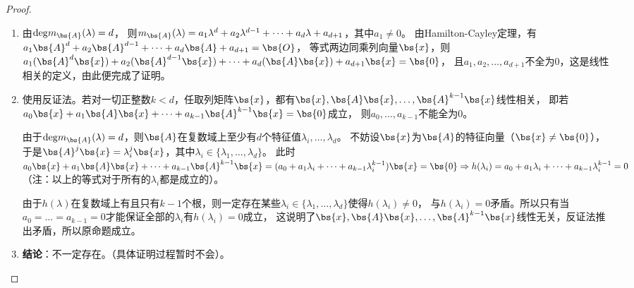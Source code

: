 \documentclass[12pt, a4paper, oneside, UTF8]{ctexbook}
\begin{document}
\begin{proof}
    \begin{enumerate}[label=(\arabic*)]
        \item 由$\mathrm{deg}m_{\bs{A}}(\lambda)=d$，
        则$m_{\bs{A}}(\lambda)=a_1\lambda^d+a_2\lambda^{d-1}+\cdots+a_d\lambda+a_{d+1}$，其中$a_1 \neq 0$。
        由Hamilton-Cayley定理，有$a_1\bs{A}^d+a_2\bs{A}^{d-1}+\cdots+a_d\bs{A}+a_{d+1}=\bs{O}$，
        等式两边同乘列向量$\bs{x}$，则$a_1(\bs{A}^d\bs{x})+a_2(\bs{A}^{d-1}\bs{x})+\cdots+a_d(\bs{A}\bs{x})+a_{d+1}\bs{x}=\bs{0}$，
        且$a_1,a_2,\ldots,a_{d+1}$不全为$0$，这是线性相关的定义，由此便完成了证明。
        \item 使用反证法。若对一切正整数$k<d$，任取列矩阵$\bs{x}$，都有$\bs{x},\bs{A}\bs{x},\ldots,\bs{A}^{k-1}\bs{x}$线性相关，
        即若$a_0\bs{x}+a_1\bs{A}\bs{x}+\cdots+a_{k-1}\bs{A}^{k-1}\bs{x}=\bs{0}$成立，
        则$a_0,\ldots,a_{k-1}$不能全为$0$。

        由于$\mathrm{deg}m_{\bs{A}}(\lambda)=d$，则$\bs{A}$在复数域上至少有$d$个特征值$\lambda_i,\ldots,\lambda_d$。
        不妨设$\bs{x}$为$\bs{A}$的特征向量（$\bs{x}\neq \bs{0}$），
        于是$\bs{A}^j\bs{x}=\lambda^j_i \bs{x}$，其中$\lambda_i \in \{\lambda_1,\ldots,\lambda_d\}$。
        此时$a_0\bs{x}+a_1\bs{A}\bs{x}+\cdots+a_{k-1}\bs{A}^{k-1}\bs{x}=
        (a_0+a_1\lambda_i+\cdots+a_{k-1}\lambda_i^{k-1})\bs{x}=\bs{0} \Rightarrow h(\lambda_i)=a_0+a_1\lambda_i+\cdots+a_{k-1}\lambda_i^{k-1}= 0$
        （注：以上的等式对于所有的$\lambda_i$都是成立的）。

        由于$h(\lambda)$在复数域上有且只有$k-1$个根，则一定存在某些$\lambda_i \in \{\lambda_1,\ldots,\lambda_d\}$使得$h(\lambda_i)\neq 0$，
        与$h(\lambda_i)=0$矛盾。所以只有当$a_0=\ldots=a_{k-1}=0$才能保证全部的$\lambda_i$有$h(\lambda_i)=0$成立，
        这说明了$\bs{x},\bs{A}\bs{x},\ldots,\bs{A}^{k-1}\bs{x}$线性无关，反证法推出矛盾，所以原命题成立。 \label{第二问解答}
        \item \textbf{结论}：不一定存在。（具体证明过程暂时不会）。
    \end{enumerate}
\end{proof}


\ifx\allfiles\undefined
\end{document}
